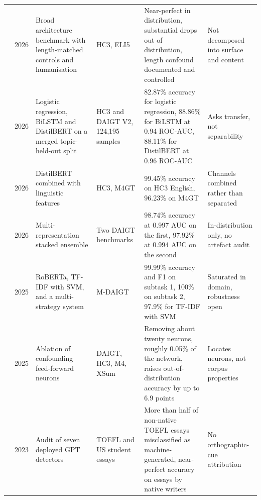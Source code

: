 \documentclass[conference,a4paper]{IEEEtran}
\begin{document}
\begin{table}[!t]
\begin{tabularx}{\textwidth}{@{}clp{2.6cm}p{2.1cm}Xp{2.5cm}@{}}
\cite{Baidya2026detecting} & 2026 & Broad architecture benchmark with length-matched controls and humanisation & HC3, ELI5 & Near-perfect in distribution, substantial drops out of distribution, length confound documented and controlled & Not decomposed into surface and content \\
\cite{Alikhanov2026generated} & 2026 & Logistic regression, BiLSTM and DistilBERT on a merged topic-held-out split & HC3 and DAIGT V2, 124,195 samples & 82.87\% accuracy for logistic regression, 88.86\% for BiLSTM at 0.94 ROC-AUC, 88.11\% for DistilBERT at 0.96 ROC-AUC & Asks transfer, not separability \\
\cite{Annepaka2026synergizing} & 2026 & DistilBERT combined with linguistic features & HC3, M4GT & 99.45\% accuracy on HC3 English, 96.23\% on M4GT & Channels combined rather than separated \\
\cite{Ansary2026multirepresentation} & 2026 & Multi-representation stacked ensemble & Two DAIGT benchmarks & 98.74\% accuracy at 0.997 AUC on the first, 97.92\% at 0.994 AUC on the second & In-distribution only, no artefact audit \\
\cite{Zain2025multi} & 2025 & RoBERTa, TF-IDF with SVM, and a multi-strategy system & M-DAIGT & 99.99\% accuracy and F1 on subtask 1, 100\% on subtask 2, 97.9\% for TF-IDF with SVM & Saturated in domain, robustness open \\
\cite{Borile2025generalize} & 2025 & Ablation of confounding feed-forward neurons & DAIGT, HC3, M4, XSum & Removing about twenty neurons, roughly 0.05\% of the network, raises out-of-distribution accuracy by up to 6.9 points & Locates neurons, not corpus properties \\
\cite{Liang2023gpt} & 2023 & Audit of seven deployed GPT detectors & TOEFL and US student essays & More than half of non-native TOEFL essays misclassified as machine-generated, near-perfect accuracy on essays by native writers & No orthographic-cue attribution \\
\bottomrule
\end{tabularx}
\end{table}

\end{document}
